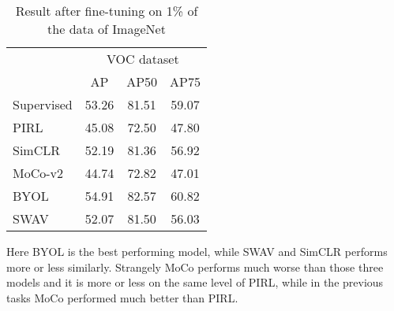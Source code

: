 \begin{table}[H]
	\centering
	\begin{tabular}{l|ccc|}
		\cline{2-4}
		& \multicolumn{3}{c|}{VOC dataset}                                                        \\ \cline{2-4} 
		& \multicolumn{1}{c|}{AP} & \multicolumn{1}{c|}{AP50} & \multicolumn{1}{c|}{AP75} \\ \hline
		\multicolumn{1}{|l|}{Supervised} & 53.26                   & 81.51                     & 59.07                     \\ \cline{1-1}
		\hline
		\multicolumn{1}{|l|}{PIRL}       & 45.08                   & 72.50                     & 47.80                     \\ \cline{1-1}
		\multicolumn{1}{|l|}{SimCLR}     & 52.19                   & 81.36                     & 56.92                     \\ \cline{1-1}
		\multicolumn{1}{|l|}{MoCo-v2}    & 44.74                   & 72.82                     & 47.01                     \\ \cline{1-1}
		\multicolumn{1}{|l|}{BYOL}       & 54.91                   & 82.57                     & 60.82                     \\ \cline{1-1}
		\multicolumn{1}{|l|}{SWAV}       & 52.07                   & 81.50                     & 56.03                     \\ \cline{1-1}
		\hline
	\end{tabular}
	\caption{Result after fine-tuning on 1\% of the data of ImageNet}
	\label{tab:object-detection}
\end{table}
Here BYOL is the best performing model, while SWAV and SimCLR performs more or less similarly. Strangely MoCo performs much worse than those three models and it is more or less on the same level of PIRL, while in the previous tasks MoCo performed much better than PIRL.

